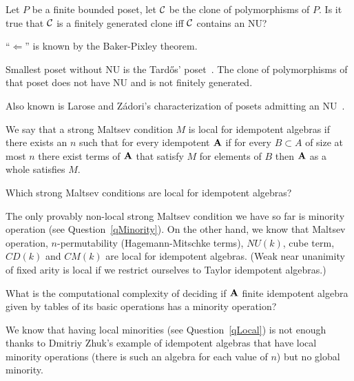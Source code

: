 \begin{question}[folklore]
  Let $P$ be a finite bounded poset, let $\cal C$ be the clone of polymorphisms
of $P$. Is it true that $\cal C$ is a finitely generated clone iff $\cal C$
contains an NU?
\end{question}
\begin{context}
``$\Leftarrow$'' is known by the Baker-Pixley theorem.

Smallest poset without NU is the Tard\H{o}s' poset~\cite{tardos}. The clone of polymorphisms
of that poset does not have NU and is not finitely generated.

Also known is Larose and Zádori's characterization of posets admitting an
NU~\cite{larose-zadori}.
\end{context}

\begin{question}\label{qLocal}
  We say that a strong Maltsev condition $M$ is local for idempotent algebras
  if there exists an $n$ such that for every idempotent ${\mathbf{A}}$ if for every
  $B\subset A$ of size at most $n$ there exist terms of ${\mathbf{A}}$ that satisfy
  $M$ for elements of $B$ then ${\mathbf{A}}$ as a whole satisfies $M$.

  Which strong Maltsev conditions are local for idempotent algebras?
\end{question}
\begin{context}
  The only provably non-local strong Maltsev condition we have so far is
  minority operation (see Question~\ref{qMinority}). On the other hand, we know
  that Maltsev operation, $n$-permutability (Hagemann-Mitschke terms), $NU(k)$, cube term, 
  $CD(k)$ and $CM(k)$ are local for
  idempotent algebras. (Weak near unanimity of fixed arity is local if we
  restrict ourselves to Taylor idempotent algebras.)
\end{context}

\begin{question}\label{qMinority}
  What is the computational complexity of deciding if ${\mathbf{A}}$ finite idempotent
  algebra given by tables of its basic operations has a minority operation?
\end{question}
\begin{context}
  We know that having local minorities (see Question~\ref{qLocal}) 
  is not enough thanks to Dmitriy Zhuk's example of idempotent 
  algebras that have local minority operations (there is such an algebra for
  each value of $n$) but no global minority.
\end{context}

